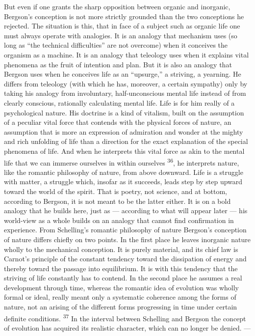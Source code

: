 \documentclass[12pt,a4paper,openany]{book}
\newcommand{\opage}[1]{\marginnote{\footnotesize\textit{[#1]}}}
\newcommand{\nm}[1]{\unskip\textsuperscript{#1}}
\begin{document}
But even if one grants the sharp opposition between organic and inorganic, Bergson's conception is not more strictly grounded than the two conceptions he rejected. The situation is this, that in face of a subject such as organic life one must always operate with analogies. It is an analogy that mechanism uses (so long as ``the technical difficulties'' are not overcome) when it conceives the organism as a machine. It is an analogy that teleology uses when it explains vital phenomena as the fruit of intention and plan. But it is also an analogy that Bergson uses when he conceives life as an ``upsurge,'' a striving, a yearning. He differs from teleology (with which he has, moreover, a certain sympathy) only by taking his analogy from involuntary, half-unconscious mental life instead of from clearly conscious, rationally calculating mental life. Life is for him really of a psychological nature. His doctrine is a kind of vitalism, built on the assumption of a peculiar vital force that contends with the physical forces of nature, an assumption that is more an expression of admiration and wonder at the mighty and rich unfolding of life than a direction for the exact explanation of the special phenomena of life. And when he interprets this vital force as akin to the mental life that we can immerse ourselves in within ourselves \nm{36}, he interprets nature, like the romantic philosophy of nature, from above downward. Life is a struggle with matter, a struggle which, insofar as it succeeds, leads step by step upward toward the world of the spirit. That is poetry, not science, and at bottom, according to Bergson, it is not meant to be the latter either. It is on a bold analogy that he builds here, just as --- according to what will appear later --- his world-view as a whole builds on an analogy that cannot find confirmation in experience.
\opage{42}From Schelling's romantic philosophy of nature Bergson's conception of nature differs chiefly on two points. In the first place he leaves inorganic nature wholly to the mechanical conception. It is purely material, and its chief law is Carnot's principle of the constant tendency toward the dissipation of energy and thereby toward the passage into equilibrium. It is with this tendency that the striving of life constantly has to contend. In the second place he assumes a real development through time, whereas the romantic idea of evolution was wholly formal or ideal, really meant only a systematic coherence among the forms of nature, not an arising of the different forms progressing in time under certain definite conditions. \nm{37} In the interval between Schelling and Bergson the concept of evolution has acquired its realistic character, which can no longer be denied. ---
\end{document}
